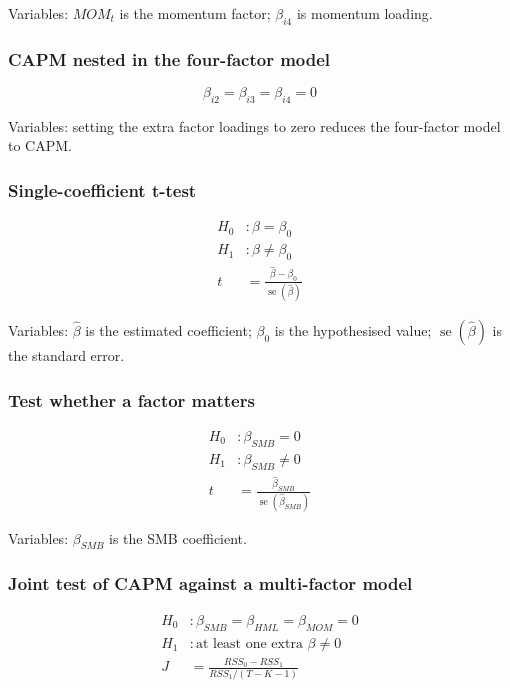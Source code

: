\documentclass[
  8pt,
  twocolumn]{extarticle}
\begin{document}
Variables: \(MOM_t\) is the momentum factor; \(\beta_{i4}\) is momentum
loading.

\subsubsection{CAPM nested in the four-factor
model}\label{capm-nested-in-the-four-factor-model}

\[
\beta_{i2}=\beta_{i3}=\beta_{i4}=0
\]

Variables: setting the extra factor loadings to zero reduces the
four-factor model to CAPM.

\subsubsection{Single-coefficient
t-test}\label{single-coefficient-t-test}

\[
\begin{aligned}
H_0&:\beta=\beta_0\\
H_1&:\beta\ne\beta_0\\
t&=\frac{\hat\beta-\beta_0}{\operatorname{se}(\hat\beta)}
\end{aligned}
\]

Variables: \(\hat\beta\) is the estimated coefficient; \(\beta_0\) is
the hypothesised value; \(\operatorname{se}(\hat\beta)\) is the standard
error.

\subsubsection{Test whether a factor
matters}\label{test-whether-a-factor-matters}

\[
\begin{aligned}
H_0&:\beta_{SMB}=0\\
H_1&:\beta_{SMB}\ne0\\
t&=\frac{\hat\beta_{SMB}}{\operatorname{se}(\hat\beta_{SMB})}
\end{aligned}
\]

Variables: \(\beta_{SMB}\) is the SMB coefficient.

\subsubsection{Joint test of CAPM against a multi-factor
model}\label{joint-test-of-capm-against-a-multi-factor-model}

\[
\begin{aligned}
H_0&:\beta_{SMB}=\beta_{HML}=\beta_{MOM}=0\\
H_1&:\text{at least one extra }\beta\ne0\\
J&=\frac{RSS_0-RSS_1}{RSS_1/(T-K-1)}
\end{aligned}
\]
\end{document}
